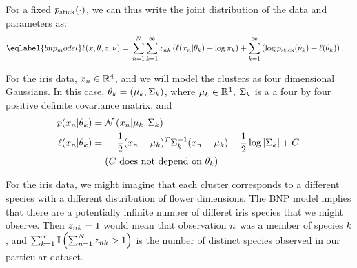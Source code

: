 For a fixed $p_{\mathrm{stick}}(\cdot)$, we can thus write the joint distribution of
the data and parameters as:
%
\begin{align}\eqlabel{bnp_model}
%
\logp(\x, \theta, \z, \nu) ={}&
    \sum_{n=1}^N \sum_{k=1}^{\infty}
        \z_{\n\k} \left(
            \logp(\x_n \vert \theta_\k) + \log \pi_\k
        \right) +
    \sum_{k=1}^{\infty} \left(
        \log \pstick(\nu_\k) + \logp(\theta_\k)
    \right).
%
\end{align}
%

\begin{ex}
%
For the iris data, $x_n \in \mathbb{R}^4$, and we will model the clusters as
four dimensional Gaussians.  In this case, $\theta_k = (\mu_k, \Sigma_k)$,
where $\mu_k \in \mathbb{R}^4$, $\Sigma_k$ is a a four by four positive
definite covariance matrix, and
%
\begin{align*}
%
p(\x_\n \vert \theta_\k) ={}& \norm{\x_n \vert \mu_\k, \Sigma_\k} \\
\logp(\x_\n \vert \theta_\k) ={}&
    -\frac{1}{2}(\x_n - \mu_k)^T \Sigma_\k^{-1} (\x_n - \mu_k)
    -\frac{1}{2} \log |\Sigma_\k| + \const.\\
    & \constdesc{\theta_\k}
%
\end{align*}

For the iris data, we might imagine that each cluster corresponds to a different
species with a different distribution of flower dimensions.  The BNP model
implies that there are a potentially infinite number of differet iris species
that we might observe.  Then $z_{nk} = 1$ would mean that observation $n$
was a member of species $k$, and $\sum_{k=1}^\infty \mathbb{I}\left( \sum_{n=1}^{N}
z_{nk} > 1\right)$ is the number of distinct species observed in our particular
dataset.
%
\end{ex}
